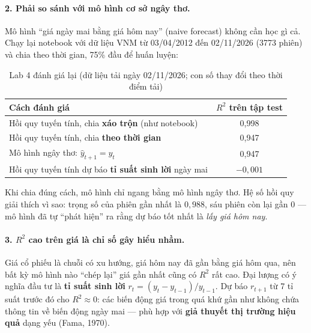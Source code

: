 \paragraph{2. Phải so sánh với mô hình cơ sở ngây thơ.} Mô hình ``giá ngày mai bằng giá hôm nay'' (naive forecast) không cần học gì cả. Chạy lại notebook với dữ liệu VNM từ 03/04/2012 đến 02/11/2026 (3773 phiên) và chia theo thời gian, 75\% đầu để huấn luyện:

\begin{table}[H]
\centering
\begin{tabular}{|l|c|}
\hline
\textbf{Cách đánh giá} & \textbf{$R^2$ trên tập test} \\
\hline
Hồi quy tuyến tính, chia \textbf{xáo trộn} (như notebook) & 0,998 \\ \hline
Hồi quy tuyến tính, chia \textbf{theo thời gian} & 0,947 \\ \hline
Mô hình ngây thơ: $\hat{y}_{t+1} = y_t$ & 0,947 \\ \hline
Hồi quy tuyến tính dự báo \textbf{tỉ suất sinh lời} ngày mai & $-0{,}001$ \\ \hline
\end{tabular}
\caption{Lab 4 đánh giá lại (dữ liệu tải ngày 02/11/2026; con số thay đổi theo thời điểm tải)}
\label{tab:lab-vnm}
\end{table}

Khi chia đúng cách, mô hình chỉ ngang bằng mô hình ngây thơ. Hệ số hồi quy giải thích vì sao: trọng số của phiên gần nhất là $0{,}988$, sáu phiên còn lại gần 0 --- mô hình đã tự ``phát hiện'' ra rằng dự báo tốt nhất là \textit{lấy giá hôm nay}.

\paragraph{3. $R^2$ cao trên giá là chỉ số gây hiểu nhầm.} Giá cổ phiếu là chuỗi có xu hướng, giá hôm nay đã gần bằng giá hôm qua, nên bất kỳ mô hình nào ``chép lại'' giá gần nhất cũng có $R^2$ rất cao. Đại lượng có ý nghĩa đầu tư là \textbf{tỉ suất sinh lời} $r_t = (y_t - y_{t-1})/y_{t-1}$. Dự báo $r_{t+1}$ từ 7 tỉ suất trước đó cho $R^2 \approx 0$: các biến động giá trong quá khứ gần như không chứa thông tin về biến động ngày mai --- phù hợp với \textbf{giả thuyết thị trường hiệu quả} dạng yếu (Fama, 1970).

